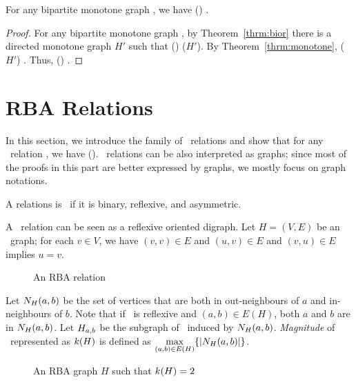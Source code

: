 \begin{theorem} 
For any bipartite monotone graph \mH, we have \chom(\mH) \maple \cbis\@.
\end{theorem}

\begin{proof}
For any bipartite monotone graph \mH, by Theorem~\ref{thrm:bior} there is a directed monotone 
graph \(H'\) such that \chom(\mH) \maple \chom(\(H'\))\@. By Theorem~\ref{thrm:monotone},
\chom(\(H'\)) \maple \cbis\@. Thus, \chom(\mH) \maple \cbis\@.
\end{proof}

\section{RBA Relations}
In this section,  we introduce the family of \RBA\ relations and show that
for any \RBA\ relation \mR, we have \cbis \maple \ccsp(\mR)\@.
\RBA\ relations can be also interpreted as graphs; since most of the proofs in this part
are better expressed by graphs, we mostly focus on graph notations.

\begin{defi} [\RBA]
A relations is \RBA\ if it is binary, reflexive, and asymmetric.
\end{defi} 

A \RBA\ relation can be seen as a reflexive oriented digraph. Let \(H=(V,E)\) be 
an \RBA\ graph; for each \(v \in V\), we have \((v,v) \in E\)
and \((u,v) \in E\) and \((v,u) \in E\) implies \(u=v\)\@.

\begin{figure}[h]
\center{}
\caption{An RBA relation}
\end{figure}

Let \(N_{H}({a},{b})\) be the set of vertices that are both in
out-neighbours of \(a\) and in-neighbours of \(b\).
Note that if \mH\ is reflexive and \((a,b)\in E(H)\),
both \(a\) and \(b\) are in \(N_{H}({a},{b})\)\@.
Let \(H_{a,b}\) be the subgraph of \mH\ induced by \(N_{H}({a},{b})\).
\emph{Magnitude} of \mH\ represented as \(k(H)\) is defined as
\(\max \limits_{(a,b) \in E(H)} \{{|N_{H}({a},{b})|}\}\)\@.

\begin{figure}[h]
\center{}
\caption{An RBA graph \ensuremath{H} such that \ensuremath{\magf(H)=2}}
\end{figure}

